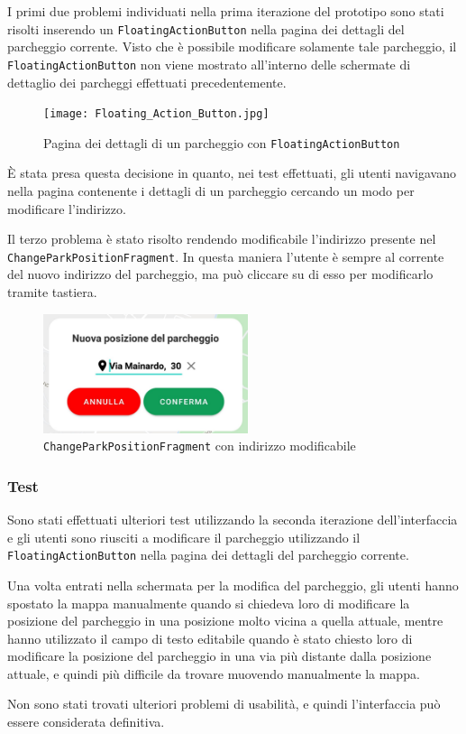 I primi due problemi individuati nella prima iterazione del prototipo sono stati risolti inserendo un \texttt{FloatingActionButton} nella pagina dei dettagli del parcheggio corrente. Visto che è possibile modificare solamente tale parcheggio, il \texttt{FloatingActionButton} non viene mostrato all'interno delle schermate di dettaglio dei parcheggi effettuati precedentemente.

\begin{figure}[H]
\centering
\texttt{[image: Floating\_Action\_Button.jpg]}
\caption{Pagina dei dettagli di un parcheggio con
\texttt{FloatingActionButton}}
\end{figure}

È stata presa questa decisione in quanto, nei test effettuati, gli utenti navigavano nella pagina contenente i dettagli di un parcheggio cercando un modo per modificare l'indirizzo.

Il terzo problema è stato risolto rendendo modificabile l'indirizzo presente nel \texttt{ChangeParkPositionFragment}. In questa maniera l'utente è sempre al corrente del nuovo indirizzo del parcheggio, ma può cliccare su di esso per modificarlo tramite tastiera.

\begin{figure}[H]
\centering
\includegraphics[width=6cm]{images/Editable_new_address.jpg}
\caption{\texttt{ChangeParkPositionFragment} con indirizzo modificabile}
\end{figure}

\hypertarget{test-1}{%
\subsubsection{Test}\label{test-1}}

Sono stati effettuati ulteriori test utilizzando la seconda iterazione dell'interfaccia e gli utenti sono riusciti a modificare il parcheggio utilizzando il \texttt{FloatingActionButton} nella pagina dei dettagli del parcheggio corrente.

Una volta entrati nella schermata per la modifica del parcheggio, gli utenti hanno spostato la mappa manualmente quando si chiedeva loro di modificare la posizione del parcheggio in una posizione molto vicina a quella attuale, mentre hanno utilizzato il campo di testo editabile quando è stato chiesto loro di modificare la posizione del parcheggio in una via più distante dalla posizione attuale, e quindi più difficile da trovare muovendo manualmente la mappa.

Non sono stati trovati ulteriori problemi di usabilità, e quindi l'interfaccia può essere considerata definitiva. 
